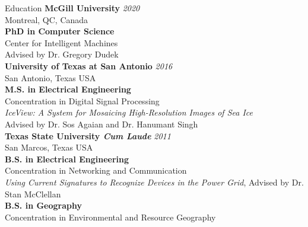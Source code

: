 \documentclass{resume} %
\begin{document}

\begin{rSection}{Education}
{\bf McGill University} \hfill {\em 2020} \\ 
Montreal, QC, Canada \\
{\bf PhD in Computer Science} \\
Center for Intelligent Machines \\
Advised by Dr. Gregory Dudek \\

{\bf University of Texas at San Antonio} \hfill {\em 2016} \\ 
San Antonio, Texas USA \\
{\bf M.S. in Electrical Engineering} \\
Concentration in Digital Signal Processing \\
\textit{IceView: A System for Mosaicing High-Resolution Images of Sea Ice} \\ 
Advised by Dr. Sos Agaian and Dr. Hanumant Singh \smallskip \\

{\bf Texas State University \textit{Cum Laude}} \hfill {\em 2011} \\ 
San Marcos, Texas USA \\
{\bf B.S. in Electrical Engineering} \\
Concentration in Networking and Communication  \\
\textit{Using Current Signatures to Recognize Devices in the Power Grid}, Advised by Dr. Stan McClellan  \smallskip \\
{\bf B.S. in Geography} \\
Concentration in Environmental and Resource Geography \\
\end{rSection}

\end{document}
